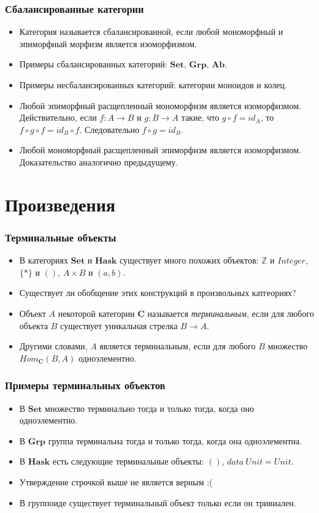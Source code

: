 \documentclass{beamer}
\theoremstyle{definition}
\newcommand{\cat}[1]{\mathbf{#1}}
\renewcommand{\C}{\cat{C}}
\newcommand{\Set}{\cat{Set}}
\newcommand{\Grp}{\cat{Grp}}
\newcommand{\Ab}{\cat{Ab}}
\newcommand{\Hask}{\cat{Hask}}
\begin{document}
\begin{frame}
\frametitle{Сбалансированные категории}
\begin{itemize}
\item Категория называется сбалансированной, если любой мономорфный и эпиморфный морфизм является изоморфизмом.
\item Примеры сбалансированных категорий: $\Set$, $\Grp$, $\Ab$.
\item Примеры несбалансированных категорий: категории моноидов и колец.
\item Любой эпиморфный расщепленный мономорфизм является изоморфизмом.
Действительно, если $f : A \to B$ и $g : B \to A$ такие, что $g \circ f = id_A$, то $f \circ g \circ f = id_B \circ f$.
Следовательно $f \circ g = id_B$.
\item Любой мономорфный расщепленный эпиморфизм является изоморфизмом. Доказательство аналогично предыдущему.
\end{itemize}
\end{frame}

\section{Произведения}

\begin{frame}
\frametitle{Терминальные объекты}
\begin{itemize}
\item В категориях $\Set$ и $\Hask$ существует много похожих объектов: $\mathbb{Z}$ и $Integer$, $\{ * \}$ и $()$, $A \times B$ и $(a, b)$.
\item Существует ли обобщение этих конструкций в произвольных катгеориях?
\item Объект $A$ некоторой категории $\C$ называется \emph{терминальным}, если для любого объекта $B$ существует уникальная стрелка $B \to A$.
\item Другими словами, $A$ является терминальным, если для любого $B$ множество $Hom_\C(B,A)$ одноэлементно.
\end{itemize}
\end{frame}

\begin{frame}
\frametitle{Примеры терминальных объектов}
\begin{itemize}
\item В $\Set$ множество терминально тогда и только тогда, когда оно одноэлементно.
\item В $\Grp$ группа терминальна тогда и только тогда, когда она одноэлементна.
\item В $\Hask$ есть следующие терминальные объекты: $()$, $data\ Unit = Unit$.
\item Утверждение строчкой выше не является верным :(
\item В группоиде существует терминальный объект только если он тривиален.
\end{itemize}
\end{frame}
\end{document}
